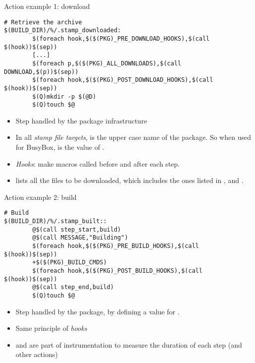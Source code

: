 \begin{frame}[fragile]{Action example 1: download}

\begin{block}{}
\begin{verbatim}
# Retrieve the archive
$(BUILD_DIR)/%/.stamp_downloaded:
        $(foreach hook,$($(PKG)_PRE_DOWNLOAD_HOOKS),$(call $(hook))$(sep))
        [...]
        $(foreach p,$($(PKG)_ALL_DOWNLOADS),$(call DOWNLOAD,$(p))$(sep))
        $(foreach hook,$($(PKG)_POST_DOWNLOAD_HOOKS),$(call $(hook))$(sep))
        $(Q)mkdir -p $(@D)
        $(Q)touch $@
\end{verbatim}
\end{block}

\begin{itemize}
\item Step handled by the package infrastructure
\item In all {\em stamp file targets},  is the upper case
  name of the package. So when used for BusyBox,
   is the value of .
\item {\em Hooks}: make macros called before and after each step.
\item {} lists all the files to be downloaded,
  which includes the ones listed in ,
   and .
\end{itemize}

\end{frame}

\begin{frame}[fragile]{Action example 2: build}

\begin{block}{}
\begin{verbatim}
# Build
$(BUILD_DIR)/%/.stamp_built::
        @$(call step_start,build)
        @$(call MESSAGE,"Building")
        $(foreach hook,$($(PKG)_PRE_BUILD_HOOKS),$(call $(hook))$(sep))
        +$($(PKG)_BUILD_CMDS)
        $(foreach hook,$($(PKG)_POST_BUILD_HOOKS),$(call $(hook))$(sep))
        @$(call step_end,build)
        $(Q)touch $@
\end{verbatim}
\end{block}

\begin{itemize}
\item Step handled by the package, by defining a value for
  .
\item Same principle of {\em hooks}
\item {} and  are part of
  instrumentation to measure the duration of each step (and other
  actions)
\end{itemize}

\end{frame}

